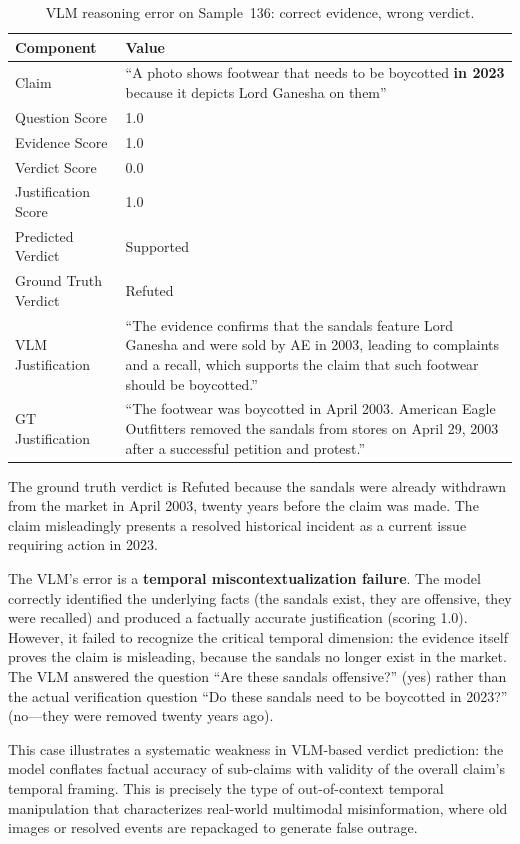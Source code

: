 \begin{table}[ht]
\centering
\caption{VLM reasoning error on Sample~136: correct evidence, wrong verdict.}
\label{tab:vlm_reasoning_error}
\begin{tabular}{p{} p{}}
\toprule
\textbf{Component} & \textbf{Value} \\
\midrule
Claim & ``A photo shows footwear that needs to be boycotted \textbf{in 2023} because it depicts Lord Ganesha on them'' \\
\midrule
Question Score & 1.0 \\
Evidence Score & 1.0 \\
Verdict Score & 0.0 \\
Justification Score & 1.0 \\
\midrule
Predicted Verdict & Supported \\
Ground Truth Verdict & Refuted \\
\midrule
VLM Justification & ``The evidence confirms that the sandals feature Lord Ganesha and were sold by AE in 2003, leading to complaints and a recall, which supports the claim that such footwear should be boycotted.'' \\
\midrule
GT Justification & ``The footwear was boycotted in April 2003. American Eagle Outfitters removed the sandals from stores on April 29, 2003 after a successful petition and protest.'' \\
\bottomrule
\end{tabular}
\end{table}

The ground truth verdict is Refuted because the sandals were already withdrawn from the market in April 2003, twenty years before the claim was made. The claim misleadingly presents a resolved historical incident as a current issue requiring action in 2023.

The VLM's error is a \textbf{temporal miscontextualization failure}. The model correctly identified the underlying facts (the sandals exist, they are offensive, they were recalled) and produced a factually accurate justification (scoring 1.0). However, it failed to recognize the critical temporal dimension: the evidence itself proves the claim is misleading, because the sandals no longer exist in the market. The VLM answered the question ``Are these sandals offensive?'' (yes) rather than the actual verification question ``Do these sandals need to be boycotted in 2023?'' (no---they were removed twenty years ago).

This case illustrates a systematic weakness in VLM-based verdict prediction: the model conflates factual accuracy of sub-claims with validity of the overall claim's temporal framing. This is precisely the type of out-of-context temporal manipulation that characterizes real-world multimodal misinformation, where old images or resolved events are repackaged to generate false outrage.

